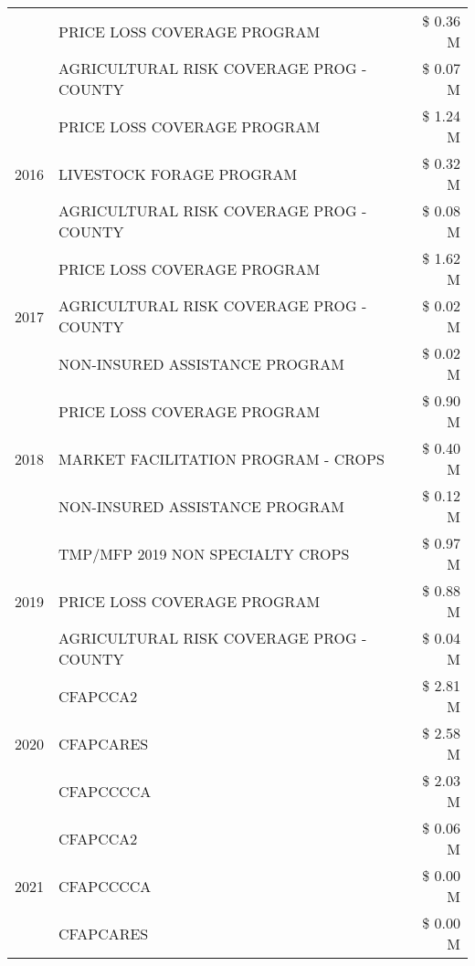 \begin{tabular}{llr}
 & PRICE LOSS COVERAGE PROGRAM & \$ 0.36 M \\
 & AGRICULTURAL RISK COVERAGE PROG - COUNTY & \$ 0.07 M \\
\cline{1-3}
\multirow[t]{3}{*}{2016} & PRICE LOSS COVERAGE PROGRAM & \$ 1.24 M \\
 & LIVESTOCK FORAGE PROGRAM & \$ 0.32 M \\
 & AGRICULTURAL RISK COVERAGE PROG - COUNTY & \$ 0.08 M \\
\cline{1-3}
\multirow[t]{3}{*}{2017} & PRICE LOSS COVERAGE PROGRAM & \$ 1.62 M \\
 & AGRICULTURAL RISK COVERAGE PROG - COUNTY & \$ 0.02 M \\
 & NON-INSURED ASSISTANCE PROGRAM & \$ 0.02 M \\
\cline{1-3}
\multirow[t]{3}{*}{2018} & PRICE LOSS COVERAGE PROGRAM & \$ 0.90 M \\
 & MARKET FACILITATION PROGRAM - CROPS & \$ 0.40 M \\
 & NON-INSURED ASSISTANCE PROGRAM & \$ 0.12 M \\
\cline{1-3}
\multirow[t]{3}{*}{2019} & TMP/MFP 2019 NON SPECIALTY CROPS & \$ 0.97 M \\
 & PRICE LOSS COVERAGE PROGRAM & \$ 0.88 M \\
 & AGRICULTURAL RISK COVERAGE PROG - COUNTY & \$ 0.04 M \\
\cline{1-3}
\multirow[t]{3}{*}{2020} & CFAPCCA2 & \$ 2.81 M \\
 & CFAPCARES & \$ 2.58 M \\
 & CFAPCCCCA & \$ 2.03 M \\
\cline{1-3}
\multirow[t]{3}{*}{2021} & CFAPCCA2 & \$ 0.06 M \\
 & CFAPCCCCA & \$ 0.00 M \\
 & CFAPCARES & \$ 0.00 M \\
\cline{1-3}
\bottomrule
\end{tabular}
